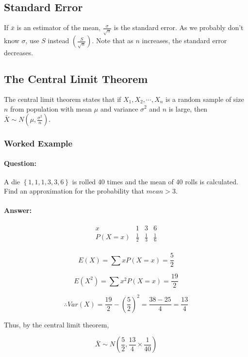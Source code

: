 \documentclass{article}
\begin{document}
\subsection{Standard Error}

If $\bar{x}$ is an estimator of the mean, $\frac{\sigma}{\sqrt n}$ is the
standard error. As we probably don't know $\sigma$, use $S$ instead
$\left(\frac{S}{\sqrt n}\right)$. Note that as $n$ increases, the standard error
decreases.

\subsection{The Central Limit Theorem}

The central limit theorem states that if $X_1,X_2,\cdots,X_n$ is a random sample
of size $n$ from population with mean $\mu$ and variance $\sigma^2$ and $n$ is
large, then $\bar{X} \sim N \left(\mu,\frac{\sigma^2}{n}\right)$.

\subsubsection{Worked Example}

\paragraph{Question:} A die $\left\{1, 1, 1, 3, 3, 6\right\}$ is rolled 40 times 
and the mean of 40 rolls is calculated. Find an approximation for the
probability that $\textit{mean}>3$.

\paragraph{Answer:}
\[\begin{array}{cccc}
    x      & 1           & 3           & 6 \\
    P(X=x) & \frac{1}{2} & \frac{1}{3} & \frac{1}{6} \\
\end{array}\]

\[E(X)=\sum x P(X=x) = \frac{5}{2}\]

\[E(X^2)=\sum x^2 P(X=x) = \frac{19}{2}\]

\[\therefore Var(X) = \frac{19}{2} - \left(\frac{5}{2}\right)^2 = \frac{38 -
25}{4} = \frac{13}{4}\]

\noindent Thus, by the central limit theorem,

\[\bar{X} \sim N\left(\frac{5}{2}, \frac{13}{4} \times \frac{1}{40}\right)\]
    
\end{document}
